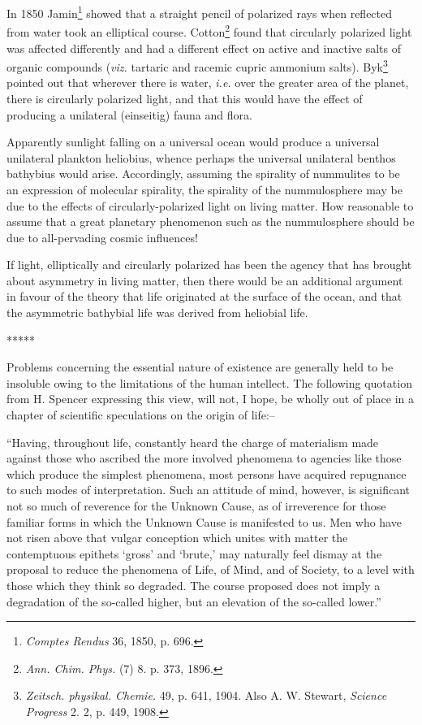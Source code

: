 \documentclass[a4paper, 12pt, oneside]{article}
\begin{document}
In 1850 Jamin\footnote{\emph{Comptes Rendus} 36, 1850, p. 696.} showed that a straight pencil of polarized rays when reflected from water took an elliptical course. Cotton\footnote{\emph{Ann. Chim. Phys.} (7) 8. p. 373, 1896.} found that circularly polarized light was affected differently and had a different effect on active and inactive salts of organic compounds (\emph{viz.} tartaric and racemic cupric ammonium salts). Byk\footnote{\emph{Zeitsch. physikal. Chemie.} 49, p. 641, 1904. Also A. W. Stewart, \emph{Science Progress} 2. 2, p. 449, 1908.} pointed out that wherever there is water, \emph{i.e.} over the greater area of the planet, there is circularly polarized light, and that this would have the effect of producing a unilateral (einseitig) fauna and flora.

Apparently sunlight falling on a universal ocean would produce a universal unilateral plankton heliobius, whence perhaps the universal unilateral benthos bathybius would arise. Accordingly, assuming the spirality of nummulites to be an expression of molecular spirality, the spirality of the nummulosphere may be due to the effects of circularly-polarized light on living matter. How reasonable to assume that a great planetary phenomenon such as the nummulosphere should be due to all-pervading cosmic influences!

If light, elliptically and circularly polarized has been the agency that has brought about asymmetry in living matter, then there would be an additional argument in favour of the theory that life originated at the surface of the ocean, and that the asymmetric bathybial life was derived from heliobial life.

\centerline{*\hspace{15mm}*\hspace{15mm}*\hspace{15mm}*\hspace{15mm}*}
\bigskip

Problems concerning the essential nature of existence are generally held to be insoluble owing to the limitations of the human intellect. The following quotation from H. Spencer expressing this view, will not, I hope, be wholly out of place in a chapter of scientific speculations on the origin of life:--

``Having, throughout life, constantly heard the charge of materialism made against those who ascribed the more involved phenomena to agencies like those which produce the simplest phenomena, most persons have acquired repugnance to such modes of interpretation. Such an attitude of mind, however, is significant not so much of reverence for the Unknown Cause, as of irreverence for those familiar forms in which the Unknown Cause is manifested to us. Men who have not risen above that vulgar conception which unites with matter the contemptuous epithets `gross' and `brute,' may naturally feel dismay at the proposal to reduce the phenomena of Life, of Mind, and of Society, to a level with those which they think so degraded. The course proposed does not imply a degradation of the so-called higher, but an elevation of the so-called lower.''
\end{document}
